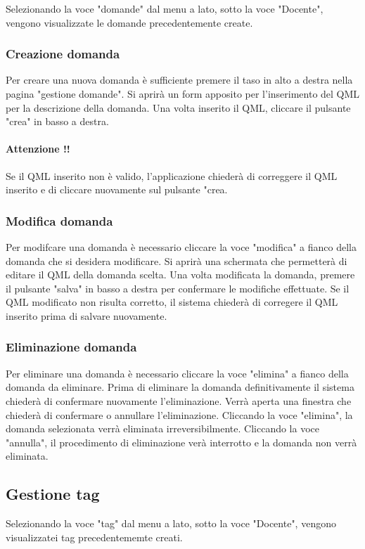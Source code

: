 \documentclass[12pt,a4paper]{article}
\begin{document}
    Selezionando la voce "domande" dal menu a lato, sotto la voce "Docente", vengono visualizzate le domande precedentemente create. 
	\subsubsection{Creazione domanda}
	Per creare una nuova domanda è sufficiente premere il taso in alto a destra nella pagina "gestione domande". 
	Si aprirà un form apposito per l'inserimento del QML per la descrizione della domanda.
	Una volta inserito il QML, cliccare il pulsante "crea" in basso a destra.
	
	\paragraph{Attenzione !!}Se il QML inserito non è valido, l'applicazione chiederà di correggere il QML inserito e di cliccare nuovamente sul pulsante "crea.
		\subsubsection{Modifica domanda}
	Per modifcare una domanda è necessario cliccare la voce "modifica" a fianco della domanda che si desidera modificare. Si aprirà una schermata che permetterà di editare il QML della domanda scelta.
	Una volta modificata la domanda, premere il pulsante "salva" in basso a destra per confermare le modifiche effettuate. 
	Se il QML modificato non risulta corretto, il sistema chiederà di corregere il QML inserito prima di salvare nuovamente.
	
		\subsubsection{Eliminazione domanda}
		Per eliminare una domanda è necessario cliccare la voce "elimina" a fianco della domanda da eliminare. Prima di eliminare la domanda definitivamente il sistema chiederà di confermare nuovamente l'eliminazione.
		Verrà aperta una finestra che chiederà di confermare o annullare l'eliminazione. Cliccando la voce "elimina", la domanda selezionata verrà eliminata irreversibilmente. Cliccando la voce "annulla", il procedimento di eliminazione verà interrotto e la domanda non verrà eliminata.
		
	\subsection{Gestione tag}
	Selezionando la voce "tag" dal menu a lato, sotto la voce "Docente", vengono visualizzatei tag precedentememte creati.
\end{document}

